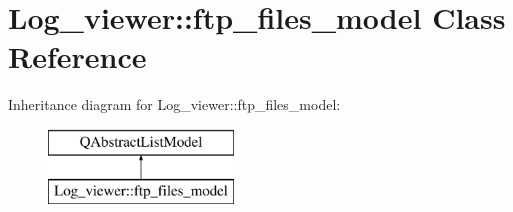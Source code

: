 \hypertarget{class_log__viewer_1_1ftp__files__model}{\section{Log\-\_\-viewer\-:\-:ftp\-\_\-files\-\_\-model Class Reference}
\label{class_log__viewer_1_1ftp__files__model}
}
Inheritance diagram for Log\-\_\-viewer\-:\-:ftp\-\_\-files\-\_\-model\-:\begin{figure}[H]
\begin{center}
\leavevmode
\includegraphics[height=2.000000cm]{class_log__viewer_1_1ftp__files__model}
\end{center}
\end{figure}
